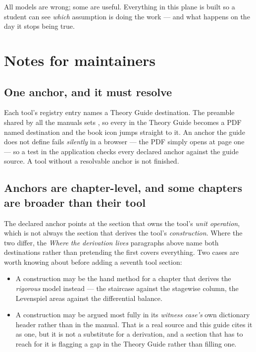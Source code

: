\documentclass[11pt,a4paper]{article}
\begin{document}
\begin{keyidea}
All models are wrong; some are useful.  Everything in this plane is built
so a student can see \emph{which} assumption is doing the work --- and
what happens on the day it stops being true.
\end{keyidea}

\section{Notes for maintainers}\label{sec:edu-maintenance}

\subsection*{One anchor, and it must resolve}

Each tool's registry entry names a Theory Guide destination.  The preamble
shared by all the manuals sets , so every
 in the Theory Guide becomes a PDF named
destination and the book icon jumps straight to it.  An anchor the guide
does not define fails \emph{silently} in a browser --- the PDF simply
opens at page one --- so a test in the application checks every declared
anchor against the guide source.  A tool without a resolvable anchor is
not finished.

\subsection*{Anchors are chapter-level, and some chapters are broader than
their tool}

The declared anchor points at the section that owns the tool's \emph{unit
operation}, which is not always the section that derives the tool's
\emph{construction}.  Where the two differ, the \emph{Where the derivation
lives} paragraphs above name both destinations rather than pretending the
first covers everything.  Two cases are worth knowing about before adding
a seventh tool section:

\begin{itemize}[leftmargin=*,nosep]
  \item A construction may be the hand method for a chapter that derives
        the \emph{rigorous} model instead --- the staircase against the
        stagewise column, the Levenspiel areas against the differential
        balance.
  \item A construction may be argued most fully in its \emph{witness
        case's} own dictionary header rather than in the manual.  That is
        a real source and this guide cites it as one, but it is not a
        substitute for a derivation, and a section that has to reach for
        it is flagging a gap in the Theory Guide rather than filling one.
\end{itemize}
\end{document}
